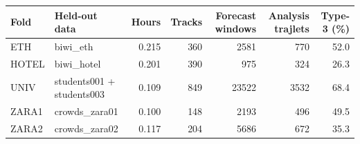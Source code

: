 \begin{tabular}{llrrrrr}
Fold & Held-out data & Hours & Tracks & Forecast windows & Analysis trajlets & Type-3 (\%) \\
\hline
ETH & biwi_eth & 0.215 & 360 & 2581 & 770 & 52.0 \\
HOTEL & biwi_hotel & 0.201 & 390 & 975 & 324 & 26.3 \\
UNIV & students001 + students003 & 0.109 & 849 & 23522 & 3532 & 68.4 \\
ZARA1 & crowds_zara01 & 0.100 & 148 & 2193 & 496 & 49.5 \\
ZARA2 & crowds_zara02 & 0.117 & 204 & 5686 & 672 & 35.3 \\
\end{tabular}
